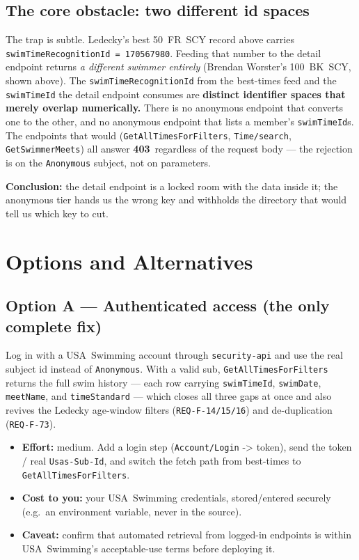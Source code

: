 \documentclass[12pt]{article}
\newcommand{\code}[1]{\texttt{#1}}
\newcommand{\no}{\textcolor{badred}{\textbf{403}}}
\begin{document}
\subsection{The core obstacle: two different id spaces}

The trap is subtle. Ledecky's best 50~FR~SCY record above carries
\code{swimTimeRecognitionId = 170567980}. Feeding that number to the detail
endpoint returns \emph{a different swimmer entirely} (Brendan Worster's
100~BK~SCY, shown above). The \code{swimTimeRecognitionId} from the
best-times feed and the \code{swimTimeId} the detail endpoint consumes are
\textbf{distinct identifier spaces that merely overlap numerically.} There
is no anonymous endpoint that converts one to the other, and no anonymous
endpoint that lists a member's \code{swimTimeId}s. The endpoints that would
(\code{GetAllTimesForFilters}, \code{Time/search}, \code{GetSwimmerMeets})
all answer \no\ regardless of the request body --- the rejection is on the
\code{Anonymous} subject, not on parameters.

\medskip
\noindent\textbf{Conclusion:} the detail endpoint is a locked room with the
data inside it; the anonymous tier hands us the wrong key and withholds the
directory that would tell us which key to cut.

\section{Options and Alternatives}

\subsection{Option A --- Authenticated access (the only complete fix)}

Log in with a USA~Swimming account through \code{security-api} and use the
real subject id instead of \code{Anonymous}. With a valid sub,
\code{GetAllTimesForFilters} returns the full swim history --- each row
carrying \code{swimTimeId}, \code{swimDate}, \code{meetName}, and
\code{timeStandard} --- which closes all three gaps at once and also revives
the Ledecky age-window filters (\code{REQ-F-14/15/16}) and de-duplication
(\code{REQ-F-73}).

\begin{itemize}[leftmargin=1.4em]
  \item \textbf{Effort:} medium. Add a login step (\code{Account/Login} ->
        token), send the token / real \code{Usas-Sub-Id}, and switch the
        fetch path from best-times to \code{GetAllTimesForFilters}.
  \item \textbf{Cost to you:} your USA~Swimming credentials, stored/entered
        securely (e.g.\ an environment variable, never in the source).
  \item \textbf{Caveat:} confirm that automated retrieval from
        logged-in endpoints is within USA~Swimming's acceptable-use terms
        before deploying it.
\end{itemize}
\end{document}
